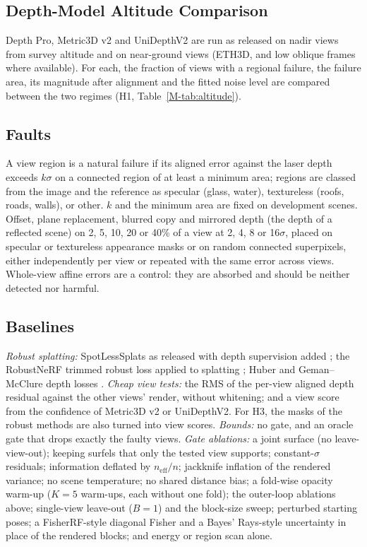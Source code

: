 \subsection{Depth-Model Altitude Comparison}
Depth Pro, Metric3D v2 and UniDepthV2 are run as released on nadir views from survey altitude and on
near-ground views (ETH3D, and low oblique frames where available). For each, the fraction of views with a
regional failure, the failure area, its magnitude after alignment and the fitted noise level are
compared between the two regimes (H1, Table~\ref{M-tab:altitude}).

\subsection{Faults}
 A view region is a natural failure if its aligned error against the laser depth
exceeds $k\sigma$ on a connected region of at least a minimum area; regions are classed from the image
and the reference as specular (glass, water), textureless (roofs, roads, walls), or other. $k$ and the minimum area
are fixed on development scenes.
 Offset, plane replacement, blurred copy and mirrored depth (the depth of a reflected
scene) on 2, 5, 10, 20 or 40\% of a view at 2, 4, 8 or 16$\sigma$, placed on specular or textureless
appearance masks or on random connected superpixels, either independently per view or repeated with
the same error across views. Whole-view affine errors are a control: they are absorbed and should be
neither detected nor harmful.

\subsection{Baselines}
\emph{Robust splatting:} SpotLessSplats as released with depth supervision added \cite{gs_spotless};
the RobustNeRF trimmed robust loss applied to splatting \cite{gs_robustnerf}; Huber and
Geman--McClure depth losses \cite{rob_blackrangarajan,rob_barron}. \emph{Cheap view tests:} the RMS of
the per-view aligned depth residual against the other views' render, without whitening; and a view
score from the confidence of Metric3D v2 or UniDepthV2. For H3, the masks of the robust methods are
also turned into view scores. \emph{Bounds:} no gate, and an oracle gate that drops exactly the faulty
views. \emph{Gate ablations:} a joint surface (no leave-view-out); keeping surfels that only the tested
view supports; constant-$\sigma$ residuals; information deflated by $n_{\mathrm{eff}}/n$; jackknife
inflation of the rendered variance; no scene temperature; no shared distance bias; a fold-wise opacity
warm-up ($K=5$ warm-ups, each without one fold); the outer-loop ablations above; single-view leave-out ($B=1$) and the block-size sweep; perturbed starting
poses; a FisherRF-style
diagonal Fisher \cite{unc_fisherrf} and a Bayes' Rays-style uncertainty \cite{unc_bayesrays} in place
of the rendered blocks; and energy or region scan alone.

